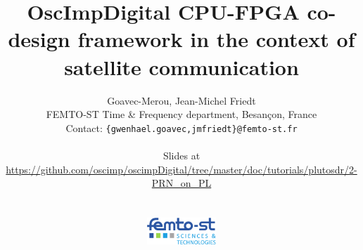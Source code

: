 \documentclass[compress,10pt]{beamer}
\begin{document}
\author[G. Goeavec- Merou \& al.]{Goavec-Merou, Jean-Michel Friedt\\
{\footnotesize
FEMTO-ST Time \& Frequency department, Besan\c con, France \\ 
}
Contact: {\tt \{gwenhael.goavec,jmfriedt\}@femto-st.fr} \\ \vspace{0.6cm}
\begin{center}
Slides at \\
\url{https://github.com/oscimp/oscimpDigital/tree/master/doc/tutorials/plutosdr/2-PRN_on_PL}\\\ \\ \ \\
\includegraphics[height=1cm]{logo_femto.pdf}\vspace{-1cm}
\end{center}
}
\title[]{OscImpDigital CPU-FPGA co-design framework in the context of satellite communication}

\begin{frame}
\titlepage
\end{frame}


\end{document}
